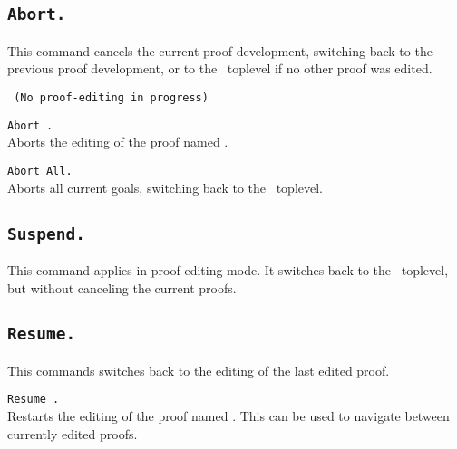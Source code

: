 \subsection{\tt Abort.}
This command cancels the current proof development, switching back to
the previous proof development, or to the \Coq\ toplevel if no other
proof was edited.

\begin{ErrMsgs}
\item {}\texttt{ (No proof-editing in progress)}
\end{ErrMsgs}

\begin{Variants}
\item {\tt Abort {\ident}.}\\
  Aborts the editing of the proof named {\ident}.
\item {\tt Abort All.}\\
  Aborts all current goals, switching back to the \Coq\ toplevel.
\end{Variants}

\subsection{\tt Suspend.}
This command applies in proof editing mode. It switches back to the
\Coq\ toplevel, but without canceling the current proofs.

\subsection{\tt Resume.}
\label{Resume}
This commands switches back to the editing of the last edited proof.

\begin{ErrMsgs}
\item {}
\end{ErrMsgs}

\begin{Variants}
\item {\tt Resume {\ident}.}\\
  Restarts the editing of the proof named {\ident}. This can be used
  to navigate between currently edited proofs.
\end{Variants}

\begin{ErrMsgs}
\item {}
\end{ErrMsgs}

